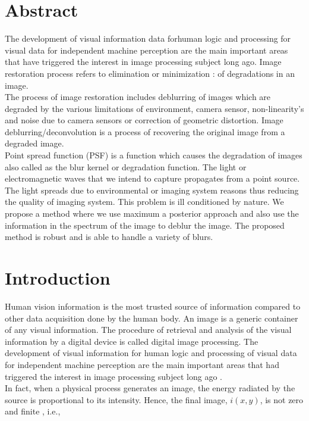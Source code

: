 \documentclass{article}
\begin{document}
\clearpage
\section{Abstract}
The development of visual information data forhuman logic and processing for visual data for independent machine perception are the main important areas that have triggered the interest in image processing subject long ago. Image restoration process refers to elimination or minimization{\color{white} :} of degradations in an image. \cite{19} \\

The process of image restoration includes deblurring of images which are degraded by the various limitations of environment, camera sensor, non-linearity’s and noise due to camera sensors or correction of geometric distortion. Image deblurring/deconvolution is a process of recovering the original image from a degraded image. \cite{21} \\

Point spread function (PSF) is a function which causes the degradation of images also called as the blur kernel or degradation function. The light or electromagnetic waves that we intend to capture propagates from a point source. The light spreads due to environmental or imaging system reasons thus reducing the quality of imaging system. This problem is ill conditioned by nature. We propose a method where we use maximum a posterior approach and also use the information in the spectrum of the image to deblur the image. The proposed method is robust and is able to handle a variety of blurs.

\clearpage
\section{Introduction}
Human vision information is the most trusted source of information compared to other data acquisition done by the human body. An image is a generic container of any visual information. The procedure of retrieval and analysis of the visual information by a digital device is called digital image processing. The development of visual information for human logic and processing of visual data for independent machine perception are the main important areas that had triggered the interest in image processing subject long ago \cite{gonzalez-woods}. \\

In fact, when a physical process generates an image, the energy radiated by the source is proportional to its intensity. Hence, the final image, $i(x,y)$, is not zero and finite \cite{jain-anil}, i.e., 
\end{document}
